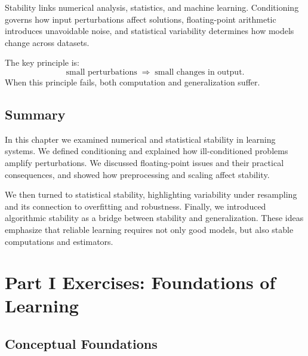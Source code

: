 Stability links numerical analysis, statistics, and machine learning. Conditioning governs how input perturbations affect solutions, floating-point arithmetic introduces unavoidable noise, and statistical variability determines how models change across datasets.

The key principle is:
\[
\text{small perturbations} \;\Rightarrow\; \text{small changes in output}.
\]
When this principle fails, both computation and generalization suffer.

\section{Summary}

In this chapter we examined numerical and statistical stability in learning systems. We defined conditioning and explained how ill-conditioned problems amplify perturbations. We discussed floating-point issues and their practical consequences, and showed how preprocessing and scaling affect stability.

We then turned to statistical stability, highlighting variability under resampling and its connection to overfitting and robustness. Finally, we introduced algorithmic stability as a bridge between stability and generalization. These ideas emphasize that reliable learning requires not only good models, but also stable computations and estimators.

\chapter*{Part I Exercises: Foundations of Learning}

\section*{Conceptual Foundations}

